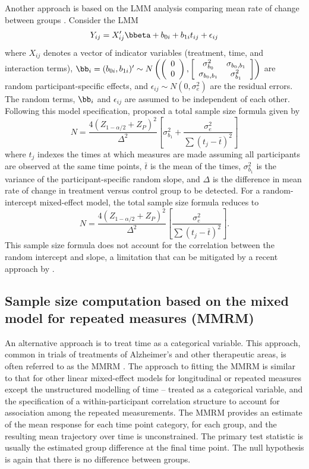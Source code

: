 Another approach is based on the LMM analysis \citep{Fitzmaurice_Laird_Ware(2004)} comparing mean rate of change between groups \citep{Ard_Edland(2011), Zhao_Edland(2020)}. Consider the LMM $$Y_{ij}=X'_{ij}\bbeta+b_{0i}+b_{1i}t_{ij}+\epsilon_{ij}$$
where $X_{ij}$ denotes a vector of indicator variables (treatment, time, and interaction terms), $\bb_i=(b_{0i},b_{1i})'\sim N\left(\left(\begin{array}{cc}
0\\0
\end{array}\right),\left[\begin{array}{cc}
\sigma^2_{b_0}&\sigma_{b_{0},b_{1}}\\
\sigma_{b_{0},b_1}&\sigma^2_{b_1}
\end{array}\right]\right)$ are random participant-specific effects, and $\epsilon_{ij}\sim N(0,\sigma^2_e)$ are the residual errors. The random terms, $\bb_i$ and $\epsilon_{ij}$ are assumed to be independent of each other. Following this model specification, \cite{Ard_Edland(2011)} proposed a total sample size formula given by
$$N=\frac{4\left(Z_{1-\alpha/2}+Z_{P}\right)^2}{\Delta^2}\left[\sigma^2_{b_1}+\frac{\sigma^2_e}{\sum (t_j-\bar{t})^2}\right]$$
where $t_j$ indexes the times at which measures are made assuming all participants are
observed at the same time points, $\bar{t}$ is the mean of the times, $\sigma^2_{b_1}$ is the variance of the participant-specific random slope, and $\Delta$ is the difference in mean rate of change in treatment versus control group to be detected. For a random-intercept mixed-effect model, the total sample size formula reduces to 
$$N=\frac{4\left(Z_{1-\alpha/2}+Z_{P}\right)^2}{\Delta^2}\left[\frac{\sigma^2_e}{\sum (t_j-\bar{t})^2}\right].$$
This sample size formula does not account for the correlation between the random intercept and slope, a limitation that can be mitigated by a recent approach by \cite{Hu_Mackey_Thomas(2021)}.

\subsection{Sample size computation based on the mixed model for repeated measures (MMRM)}
\label{model2}
An alternative approach is to treat time as a categorical variable. This approach, common in trials of treatments of Alzheimer’s and other therapeutic areas, is often referred to as the MMRM \citep{Mallinckrodt_etal(2001),Mallinckrodt_etal(2003),Lane(2008)}. The approach to fitting the MMRM is similar to that for other linear mixed-effect models for longitudinal or repeated measures except the unstructured modelling of time – treated as a categorical variable, and the specification of a within-participant correlation structure to account for association among the repeated measurements. The MMRM provides an estimate of the mean response for each time point category, for each group, and the resulting mean trajectory over time is unconstrained. The primary test statistic is usually the estimated group difference at the final time point. The null hypothesis is again that there is no difference between groups.

